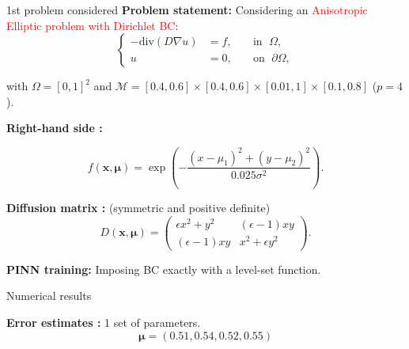 \begin{frame}{1st problem considered} 
	\textbf{Problem statement:} Considering an \textcolor{red}{Anisotropic Elliptic problem with Dirichlet BC}:
	\vspace{-5pt}
	\begin{equation*}
		\left\{
		\begin{aligned}
			-\text{div}(D\nabla u) & = f, \; &  & \text{in } \; \Omega, \\
			u         & =0, \;  &  & \text{on } \; \partial\Omega,
		\end{aligned}
		\right.
	\end{equation*}

	with $\Omega=[0,1]^2$ and $\mathcal{M}=[0.4, 0.6]\times [0.4, 0.6]\times [0.01,1]\times [0.1,0.8]$ ($p=4$).
	
	\vspace{8pt}
	\textbf{Right-hand side :}

	\vspace{-5pt}
	\begin{equation*}
		f(\bm{x},\bm{\mu})=\exp\left(-\frac{(x-\mu_1)^2+(y-\mu_2)^2}{0.025\sigma^2}\right).
	\end{equation*}
	
	\textbf{Diffusion matrix :} (symmetric and positive definite)
	\begin{equation*}
		D(\bm{x},\bm{\mu})=\begin{pmatrix}
			\epsilon x^2+y^2 & (\epsilon-1)xy \\
			(\epsilon-1)xy & x^2+\epsilon y^2
		\end{pmatrix}.
	\end{equation*}

	\vspace{2pt}
	\small
	\textbf{PINN training:} Imposing BC exactly with a level-set function.
\end{frame}

\begin{frame}{Numerical results}
	\hspace{-5pt}\begin{minipage}[t]{0.46\linewidth}
		\textbf{Error estimates :} 1 set of parameters.
		$$\bm{\mu}=(0.51,0.54,0.52,0.55)$$
		\vspace{-35pt}
		\begin{figure}[H]
		\end{figure}
	\end{minipage} \qquad \small
	\begin{minipage}[t]{0.48\linewidth}
	\end{minipage}
\end{frame}

